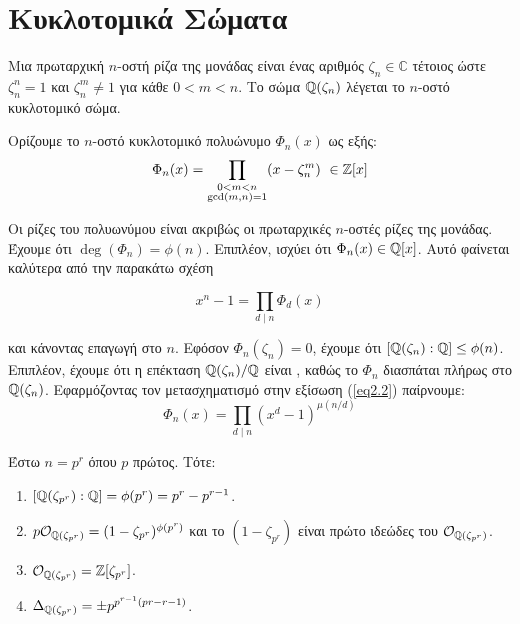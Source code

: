 \section{Κυκλοτομικά Σώματα}


\begin{defn}Μια πρωταρχική $n$-οστή ρίζα της μονάδας είναι ένας αριθμός $\zeta_n \in \mathbb{C}$ τέτοιος ώστε $\zeta_n^n = 1$ και 
	$\zeta_n^m \neq 1$ για κάθε $0<m<n$. Το σώμα $\mathbb{Q}(\zeta_n)$ λέγεται το $n$-οστό κυκλοτομικό σώμα. 
\end{defn}

\noindent Ορίζουμε το $n$-οστό κυκλοτομικό πολυώνυμο $\Phi_n(x)$ ως εξής:
$$\Phi_n(x) = \prod\limits_{\substack{ 0 < m < n \\ \gcd(m,n)=1}} (x - \zeta_n^m) \ \in \mathbb{Z}[x]$$

\noindent Οι ρίζες του πολυωνύμου είναι ακριβώς οι πρωταρχικές $n$-οστές ρίζες της μονάδας. Έχουμε ότι $\deg (\Phi_n) = \phi(n)$. 
Επιπλέον, ισχύει ότι $\Phi_n(x) \in \mathbb{Q}[x]$. Αυτό φαίνεται καλύτερα από την παρακάτω σχέση

\begin{equation} \label{eq2.2}
	x^n-1 = \prod\limits_{d \mid n} \Phi_d(x)
\end{equation}

\noindent και κάνοντας επαγωγή στο $n$. Εφόσον $\Phi_n(\zeta_n) = 0$, έχουμε ότι $[\mathbb{Q}(\zeta_n):\mathbb{Q}] \leq \phi(n)$. Επιπλέον, έχουμε 
ότι η επέκταση $\mathbb{Q}(\zeta_n)/\mathbb{Q}$ είναι , καθώς το $\Phi_n$ διασπάται πλήρως στο $\mathbb{Q}(\zeta_n)$. Εφαρμόζοντας τον μετασχηματισμό 
 στην εξίσωση (\ref{eq2.2}) παίρνουμε:
$$\Phi_n(x) = \prod\limits_{d\mid n} (x^d-1)^{\mu(n/d)}$$

\begin{lemma}Έστω $n=p^r$ όπου $p$ πρώτος. Τότε:
	\begin{enumerate}
	\item $[\mathbb{Q}(\zeta_{p^r}):\mathbb{Q}] = \phi(p^r) = p^r-p^{r-1}$.
	\item $p \mathcal{O}_{\mathbb{Q}(\zeta_{p^r})} = (1-\zeta_{p^r})^{\phi(p^r)}$ και το $(1-\zeta_{p^r})$ είναι πρώτο ιδεώδες του $\mathcal{O}_{\mathbb{Q}(\zeta_{p^r})}$.
	\item $\mathcal{O}_{\mathbb{Q}(\zeta_{p^r})} = \mathbb{Z}[\zeta_{p^r}]$.
	\item $\Delta_{\mathbb{Q}(\zeta_{p^r})} = \pm p^{p^{r-1}(pr-r-1)}$. 
	\end{enumerate}
\end{lemma}

	
